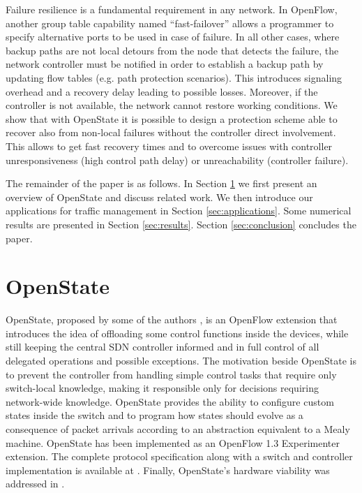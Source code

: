 \documentclass[10pt,conference]{IEEEtran}
\begin{document}
Failure resilience is a fundamental requirement in any network. In OpenFlow, another group table capability named ``fast-failover'' allows a programmer to specify alternative ports to be used in case of failure. In all other cases, where backup paths are not local detours from the node that detects the failure, the network controller must be notified in order to establish a backup path by updating flow tables (e.g. path protection scenarios). This introduces signaling overhead and a recovery delay leading to possible losses. Moreover, if the controller is not available, the network cannot restore working conditions. We show that with OpenState it is possible to design a protection scheme able to recover also from non-local failures without the controller direct involvement. This allows to get fast recovery times and to overcome issues with controller unresponsiveness (high control path delay) or unreachability (controller failure).

The remainder of the paper is as follows. In Section \ref{sec:openstate} we first present an overview of OpenState and discuss related work. We then introduce our applications for traffic management in Section \ref{sec:applications}. Some numerical results are presented in Section \ref{sec:results}. Section \ref{sec:conclusion} concludes the paper.  

\section{OpenState}
\label{sec:openstate}

OpenState, proposed by some of the authors \cite{bianchi14}, is an OpenFlow extension that introduces the idea of offloading some control functions inside the devices, while still keeping the central SDN controller informed and in full control of all delegated operations and possible exceptions. The motivation beside OpenState is to prevent the controller from handling simple control tasks that require only switch-local knowledge, making it responsible only for decisions requiring network-wide knowledge. OpenState provides the ability to configure custom states inside the switch and to program how states should evolve as a consequence of packet arrivals according to an abstraction equivalent to a Mealy machine. OpenState has been implemented as an OpenFlow 1.3 Experimenter extension. The complete protocol specification along with a switch and controller implementation is available at \cite{openstatehomepage}. Finally, OpenState's hardware viability was addressed in \cite{pontarelli15}.
\end{document}
